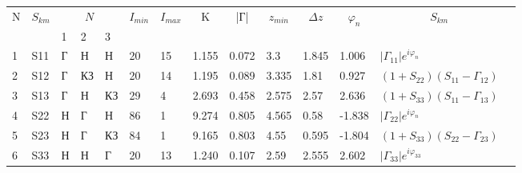 
\begin{tabular}{|l|l|l|l|l|l|l|l|l|l|l|l|l|l}
\cline{1-13}
\multicolumn{1}{|c|}{\multirow{2}{*}{N}} & \multicolumn{1}{c|}{\multirow{2}{*}{$S_{km}$}} & \multicolumn{3}{c|}{$N_{}$} & \multicolumn{1}{c|}{\multirow{2}{*}{$I_{min}$}} & \multicolumn{1}{c|}{\multirow{2}{*}{$I_{max}$}} & \multicolumn{1}{c|}{\multirow{2}{*}{K}} & \multicolumn{1}{c|}{\multirow{2}{*}{|Г|}} & \multicolumn{1}{c|}{\multirow{2}{*}{$z_{min}$}} & \multicolumn{1}{c|}{\multirow{2}{*}{$\Delta z$}} & \multicolumn{1}{c|}{\multirow{2}{*}{$\varphi_n$}} & \multicolumn{1}{c|}{\multirow{2}{*}{$S_{km}$}} &  \\ \cline{3-5}
\multicolumn{1}{|c|}{} & \multicolumn{1}{c|}{}  & 1& 2 & 3& \multicolumn{1}{c|}{}   & \multicolumn{1}{c|}{}   & \multicolumn{1}{c|}{} & \multicolumn{1}{c|}{}   & \multicolumn{1}{c|}{}   & \multicolumn{1}{c|}{}    & \multicolumn{1}{c|}{}     & \multicolumn{1}{c|}{}  &  \\ \cline{1-13}

1     & S11   & Г     & Н     & Н     & 20    & 15    & 1.155 & 0.072 & 3.3   & 1.845 & 1.006  &$|\Gamma_{11}|e^{i\varphi_n}$     &  \\ \cline{1-13}
2     & S12   & Г     & КЗ    & Н     & 20    & 14    & 1.195 & 0.089 & 3.335 & 1.81  & 0.927  &$(1+S_{22})(S_{11}-\Gamma_{12})$  &  \\ \cline{1-13}
3     & S13   & Г     & Н     & КЗ    & 29    & 4     & 2.693 & 0.458 & 2.575 & 2.57  & 2.636  &$(1+S_{33})(S_{11}-\Gamma_{13})$  &  \\ \cline{1-13}
4     & S22   & Н     & Г     & Н     & 86    & 1     & 9.274 & 0.805 & 4.565 & 0.58  & -1.838  &$|\Gamma_{22}|e^{i\varphi_n}$     &  \\ \cline{1-13}
5     & S23   & Н     & Г     & КЗ    & 84    & 1     & 9.165 & 0.803 & 4.55  & 0.595 & -1.804  &$(1+S_{33})(S_{22}-\Gamma_{23})$  &  \\ \cline{1-13}
6     & S33   & Н     & Н     & Г     & 20    & 13    & 1.240 & 0.107 & 2.59  & 2.555 & 2.602  &$|\Gamma_{33}|e^{i\varphi_{33}}$  &  \\ \cline{1-13}
\end{tabular}


